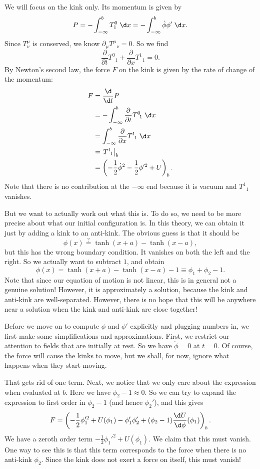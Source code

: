 \documentclass[a4paper]{article}
\begin{document}
We will focus on the kink only. Its momentum is given by
\[
  P = - \int_{-\infty}^b T^0_1 \;\d x = - \int_{-\infty}^b \dot{\phi} \phi' \;\d x.
\]
Since $T^\mu_\nu$ is conserved, we know $\partial_\mu T^\mu\!_\nu = 0$. So we find
\[
  \frac{\partial}{\partial t} T^0\!_1 + \frac{\partial}{\partial x}T^1\!_1 = 0.
\]
By Newton's second law, the force $F$ on the kink is given by the rate of change of the momentum:
\begin{align*}
  F &= \frac{\d}{\d t} P \\
  &= -\int_{-\infty}^b \frac{\partial}{\partial t} T^0\!_1\;\d x \\
  &= \int_{-\infty}^b \frac{\partial}{\partial x} T^1\!_1\;\d x\\
  &= \left.T^1\!_1\right|_b\\
  &= \left(-\frac{1}{2} \dot{\phi}^2 - \frac{1}{2} \phi'^2 + U\right)_b.
\end{align*}
Note that there is no contribution at the $-\infty$ end because it is vacuum and $T^1\!_1$ vanishes.

But we want to actually work out what this is. To do so, we need to be more precise about what our initial configuration is. In this theory, we can obtain it just by adding a kink to an anti-kink. The obvious guess is that it should be
\[
  \phi(x) \overset{?}{=} \tanh(x + a) - \tanh(x - a),
\]
but this has the wrong boundary condition. It vanishes on both the left and the right. So we actually want to subtract $1$, and obtain
\[
  \phi(x) = \tanh(x + a) - \tanh(x - a) - 1 \equiv \phi_1 + \phi_2 - 1.
\]
Note that since our equation of motion is not linear, this is in general not a genuine solution! However, it is approximately a solution, because the kink and anti-kink are well-separated. However, there is no hope that this will be anywhere near a solution when the kink and anti-kink are close together!

Before we move on to compute $\dot{\phi}$ and $\phi'$ explicitly and plugging numbers in, we first make some simplifications and approximations. First, we restrict our attention to fields that are initially at rest. So we have $\dot{\phi} = 0$ at $t = 0$. Of course, the force will cause the kinks to move, but we shall, for now, ignore what happens when they start moving.

That gets rid of one term. Next, we notice that we only care about the expression when evaluated at $b$. Here we have $\phi_2 - 1 \approx 0$. So we can try to expand the expression to first order in $\phi_2 - 1$ (and hence $\phi_2'$), and this gives
\[
  F = \left(-\frac{1}{2}\phi_1'^2 + U(\phi_1) - \phi_1' \phi_2' + (\phi_2 - 1) \frac{\d U}{\d \phi}(\phi_1)\right)_b.
\]
We have a zeroth order term $-\frac{1}{2} \phi_1'^2 + U(\phi_1)$. We claim that this must vanish. One way to see this is that this term corresponds to the force when there is no anti-kink $\phi_2$. Since the kink does not exert a force on itself, this must vanish!
\end{document}
